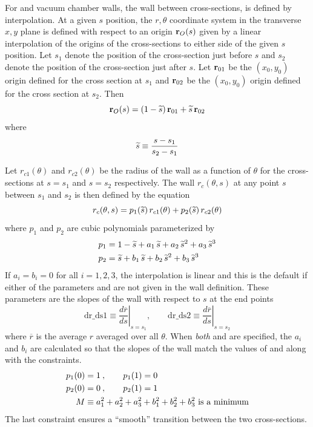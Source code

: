 For  and vacuum chamber walls, the wall between cross-sections, is defined by
interpolation. At a given $s$ position, the $r, \theta$ coordinate system in the transverse $x, y$
plane is defined with respect to an origin ${\bf r}_O(s)$ given by a linear interpolation of the
origins of the cross-sections to either side of the given $s$ position. Let $s_1$ denote the
position of the cross-section just before $s$ and $s_2$ denote the position of the cross-section
just after $s$. Let ${\bf r}_{01}$ be the $(x_0, y_0)$ origin defined for the cross section at $s_1$
and ${\bf r}_{02}$ be the $(x_0, y_0)$ origin defined for the cross section at $s_2$. Then
\begin{equation}
  {\bf r}_O(s) = (1 - {\widetilde s}) \, {\bf r}_{01} + {\widetilde s} \, {\bf r}_{02}
\end{equation}
where 
\begin{equation}
  {\widetilde s} \equiv \frac{s - s_1}{s_2 - s_1}
\end{equation}

Let $r_{c1}(\theta)$ and $r_{c2}(\theta)$ be the radius of the wall as a function of $\theta$ for
the cross-sections at $s = s_1$ and $s = s_2$ respectively. The wall $r_c(\theta, s)$ at any point
$s$ between $s_1$ and $s_2$ is then defined by the equation
\begin{equation}
  r_c(\theta, s) = p_1({\widetilde s}) \, r_{c1}(\theta) + p_2({\widetilde s}) \, r_{c2}(\theta)
\end{equation}
where $p_1$ and $p_2$ are cubic polynomials parameterized by
\begin{align}
  p_1 &= 1 - {\widetilde s} + a_1 \, {\widetilde s} + a_2 \, {\widetilde s}^2 + a_3 \, {\widetilde s}^3 \nonumber \\
  p_2 &= {\widetilde s} + b_1 \, {\widetilde s} + b_2 \, {\widetilde s}^2 + b_3 \, {\widetilde s}^3 
\end{align}
If $a_i = b_i = 0$ for all $i = 1, 2, 3$, the interpolation is linear and this is the default if
either of the parameters  and  are not given in the wall definition. These
parameters are the slopes of the wall with respect to $s$ at the end points
\begin{equation}
  \text{dr_ds1} \equiv \left. \frac{d\overline{r}}{ds} \right|_{s = s_1} \comma \qquad
  \text{dr_ds2} \equiv \left. \frac{d\overline{r}}{ds} \right|_{s = s_2} 
\end{equation}
where $\overline{r}$ is the average $r$ averaged over all $\theta$. When {\em both}  and
 are specified, the $a_i$ and $b_i$ are calculated so that the slopes of the wall match
the values of  and  along with the constraints.
\begin{align}
  p_1(0) &= 1 \> , \qquad p_1(1) = 0 \nonumber \\
  p_2(0) &= 0 \> , \qquad p_2(1) = 1 \\
  M &\equiv a_1^2 + a_2^2 + a_3^2 + b_1^2 + b_2^2 + b_3^2 \text{ is a minimum}
  \nonumber
\end{align}
The last constraint ensures a ``smooth'' transition between the two cross-sections.

